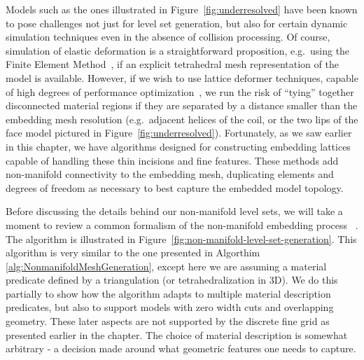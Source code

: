 Models such as the ones illustrated in Figure~\ref{fig:underresolved}
have been known to pose challenges not just for level set generation,
but also for certain dynamic simulation techniques even in the absence
of collision processing. Of course, simulation of elastic deformation
is a straightforward proposition, e.g.\ using the Finite Element
Method~\citep{SifakB:2012}, if an explicit tetrahedral mesh
representation of the model is available. However, if we wish to use
lattice deformer techniques, capable of high degrees of performance
optimization~\citep{RiverJ:2007,McAdaZSETTS:2011,MitchCS:2015}, we run
the risk of ``tying'' together disconnected material regions if they
are separated by a distance smaller than the embedding mesh resolution
(e.g.\ adjacent helices of the coil, or the two lips of the face model
pictured in Figure~\ref{fig:underresolved}). Fortunately, as we saw
earlier in this chapter, we have algorithms designed for constructing
embedding lattices capable of handling these thin incisions and fine
features. These methods add non-manifold connectivity to the embedding
mesh, duplicating elements and degrees of freedom as necessary to best
capture the embedded model topology.


Before discussing the details behind our non-manifold level sets, we
will take a moment to review a common formalism of the non-manifold
embedding process ~\citep{SifakDF:2007}. The algorithm is illustrated in
Figure~\ref{fig:non-manifold-level-set-generation}. This algorithm is
very similar to the one presented in Algorthim
\ref{alg:NonmanifoldMeshGeneration}, except here we are assuming a
material predicate defined by a triangulation (or tetrahedralization
in 3D). We do this partially to show how the algorithm adapts to
multiple material description predicates, but also to support models
with zero width cuts and overlapping geometry. These later aspects are
not supported by the discrete fine grid as presented earlier in the
chapter. The choice of material description is somewhat arbitrary - a
decision made around what geometric features one needs to capture. 

